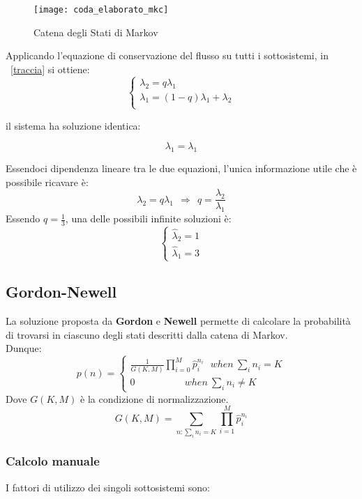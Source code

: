 \begin{figure}[!htbp]
  \centering
  \texttt{[image: coda\_elaborato\_mkc]}
  \caption{Catena degli Stati di Markov}
  \label{}
\end{figure}

Applicando l'equazione di conservazione del flusso su tutti i sottosistemi, in
\figurename~\ref{traccia} si ottiene:
$$
\begin{cases}\lambda_2 = q\lambda_1 \\
\lambda_1 = (1-q)\lambda_1 + \lambda_2 \\
\end{cases}
$$


il sistema ha soluzione identica:

$$ \lambda_1 = \lambda_1 $$

Essendoci dipendenza lineare tra le due equazioni, l'unica informazione utile che
è possibile ricavare è:
$$ \lambda_2 = q \lambda_1 \ \ \Longrightarrow \ \ q=\frac{\lambda_2}{\lambda_1}$$
Essendo $q = \frac{1}{3} $, una delle possibili infinite soluzioni è:
$$
\begin{cases}
\widehat{\lambda}_2 = 1 \\
\widehat{\lambda}_1 = 3
\end{cases}
$$

\clearpage

\subsection{Gordon-Newell}
La soluzione proposta da \textbf{Gordon} e \textbf{Newell} permette di calcolare
la probabilità di trovarsi in ciascuno degli stati descritti dalla catena di Markov.\\
Dunque:
$$ p(n)=
\begin{cases}
  \frac{1}{G(K,M)}\prod_{i=0}^M \widehat{p}_i^{n_i} \ \ \ when \ \sum_{i}n_i = K\\
  0 \ \ \ \ \ \ \ \ \ \ \ \ \ \ \ \ \ \ \ \ \ \ \ when \ \sum_{i}n_i \neq K
\end{cases}
$$
Dove $G(K,M)$ è la condizione di normalizzazione.
$$ G(K,M)=\sum_{n : \sum_{i}n_i=K} \prod_{i=1}^M \widehat{p}_i^{n_i}$$


\subsubsection{Calcolo manuale}

I fattori di utilizzo dei singoli sottosistemi sono:

